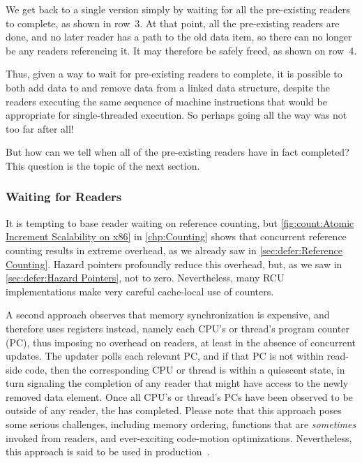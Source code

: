 We get back to a single version simply by waiting for all the
pre-existing readers to complete, as shown in row~3.
At that point, all the pre-existing readers are done, and no later
reader has a path to the old data item, so there can no longer be
any readers referencing it.
It may therefore be safely freed, as shown on row~4.

Thus, given a way to wait for pre-existing readers to complete,
it is possible to both add data to and remove data from a linked
data structure, despite the readers executing the same sequence
of machine instructions that would be appropriate for single-threaded
execution.
So perhaps going all the way was not too far after all!

But how can we tell when all of the pre-existing readers have in
fact completed?
This question is the topic of the next section.

\subsubsection{Waiting for Readers}
\label{sec:defer:Waiting for Readers}

It is tempting to base reader waiting on reference counting, but
\cref{fig:count:Atomic Increment Scalability on x86}
in
\cref{chp:Counting}
shows that concurrent reference counting results in extreme overhead,
as we already saw in
\cref{sec:defer:Reference Counting}.
Hazard pointers profoundly reduce this overhead, but, as we saw in
\cref{sec:defer:Hazard Pointers}, not to zero.
Nevertheless, many RCU implementations make very careful cache-local
use of counters.

A second approach observes that memory synchronization is expensive,
and therefore uses registers instead, namely each CPU's or thread's
program counter (PC), thus imposing no overhead on readers, at least
in the absence of concurrent updates.
The updater polls each relevant PC, and if that PC is not within read-side
code, then the corresponding CPU or thread is within a quiescent state,
in turn signaling the completion of any reader that might have access
to the newly removed data element.
Once all CPU's or thread's PCs have been observed to be outside of any
reader, the  has completed.
Please note that this approach poses some serious challenges, including
memory ordering, functions that are \emph{sometimes} invoked from readers,
and ever-exciting code-motion optimizations.
Nevertheless, this approach is said to be used in
production~\cite{MikeAsh2015Apple}.


